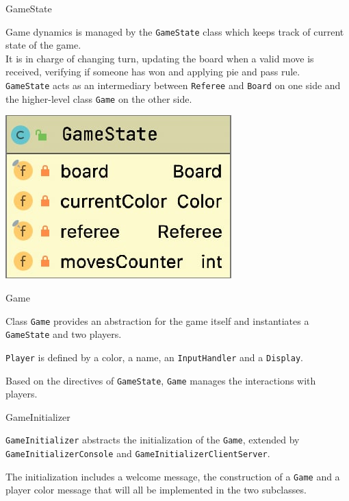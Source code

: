 \documentclass{beamer}
\begin{document}
\begin{frame}{GameState}
     
     Game dynamics is managed by the \texttt{GameState} class which keeps track of current state of the game.
     \vspace{0.4cm}
     \\It is in charge of changing turn, updating the board when a valid move is received, verifying if someone has won and applying pie and pass rule.
     \vspace{0.4cm}
     \\ \texttt{GameState} acts as an intermediary between \texttt{Referee} and \texttt{Board} on one side and the higher-level class \texttt{Game} on the other 	side.
     \begin{center}
     	\includegraphics[scale=0.32]{images/gamestate.png}
     \end{center}
\end{frame}

\begin{frame}{Game}

	Class \texttt{Game} provides an abstraction for the game itself and instantiates a \texttt{GameState} and two players.
	
	 \texttt{Player} is defined by a color, a name, an \texttt{InputHandler} and a \texttt{Display}.
	 
	Based on the directives of \texttt{GameState}, \texttt{Game} manages the interactions with players.
\end{frame}

\begin{frame}{GameInitializer}

	\texttt{GameInitializer} abstracts the initialization of the \texttt{Game}, extended by \texttt{GameInitializerConsole} and \texttt{GameInitializerClientServer}.
	
	The initialization includes a welcome message, the construction of a \texttt{Game} and a player color message that will all be implemented in the two 	subclasses. 

\end{frame}











     
\end{document}
